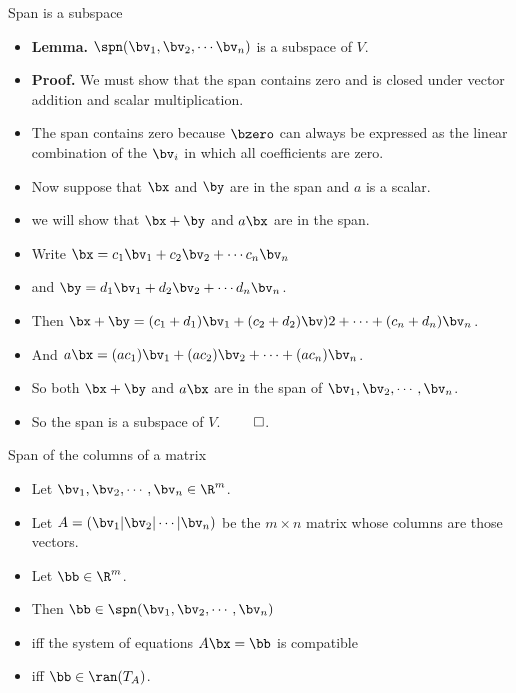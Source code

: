 \documentclass[handout]{beamer}
\begin{document}
\begin{frame}{Span is a subspace}

\begin{itemize}
\item \textbf{Lemma.} $\spn(\bv_1,\bv_2,\cdots\bv_n)$ is a subspace of $V$.
\item \textbf{Proof.} We must show that the span contains zero and is closed under vector addition
and scalar multiplication.
\item The span contains zero because $\bzero$ can always be expressed as the linear combination
of the $\bv_i$ in which all coefficients are zero.
\item Now suppose that $\bx$ and $\by$ are in the span and $a$ is a scalar.
\item we will show that $\bx+\by$ and $a \bx$ are in the span.
\item Write $\bx = c_1\bv_1 + c_2\bv_2 + \cdots c_n \bv_n$
\item and $\by = d_1\bv_1 + d_2\bv_2 + \cdots d_n \bv_n$.
\item Then $\bx + \by = (c_1 + d_1) \bv_1 + (c_2 +d_2)\bv)2 + \cdots + (c_n+d_n)\bv_n$.
\item And $a\bx = (ac_1)\bv_1 + (ac_2)\bv_2 + \cdots + (ac_n)\bv_n$.
\item So both $\bx+\by$ and $a\bx$ are in the span of $\bv_1,\bv_2,\cdots,\bv_n$.
\item So the span is a subspace of $V$. $\qed$.
\end{itemize}
\end{frame}


\begin{frame}{Span of the columns of a matrix}

\begin{itemize}
\item Let $\bv_1,\bv_2,\cdots,\bv_n \in \R^m$.
\item Let $A =\left( \bv_1 \vert \bv_2 \vert \cdots \vert \bv_n \right)$
be the $m\times n$ matrix whose columns are those vectors.
\item Let $\bb\in\R^m$.
\item Then $\bb\in\spn(\bv_1,\bv_2,\cdots,\bv_n)$
\item iff the system of equations $A\bx=\bb$ is compatible
\item iff $\bb\in\ran(T_A)$.
\end{itemize}

\end{frame}
\end{document}
